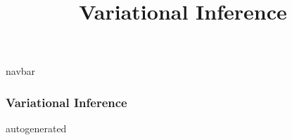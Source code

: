 \title{Variational Inference}

{{navbar}}

\subsubsection{Variational Inference}

{{autogenerated}}
